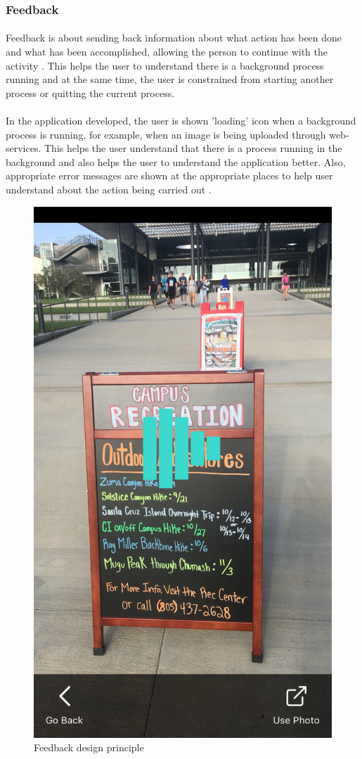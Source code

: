 \documentclass[12pt]{article}
\begin{document}
        \subsubsection{Feedback}
       \paragraph{}Feedback is about sending back information about what action has been done and what has been accomplished, allowing the person to continue with the activity \cite{norman}. This helps the user to understand there is a background process running and at the same time, the user is constrained from starting another process or quitting the current process. 
       
       \paragraph{}In the application developed, the user is shown 'loading' icon when a background process is running, for example, when an image is being uploaded through web-services. This helps the user understand that there is a process running in the background and also helps the user to understand the application better. Also, appropriate error messages are shown at the appropriate places to help user understand about the action being carried out \cite{norman}.
       
       \begin{figure}[H]
	\centering
	\includegraphics[width=0.5\linewidth]{media/loading1.PNG}
	\caption{Feedback design principle}
	\label{fig:feedback}
\end{figure} 
\end{document}
